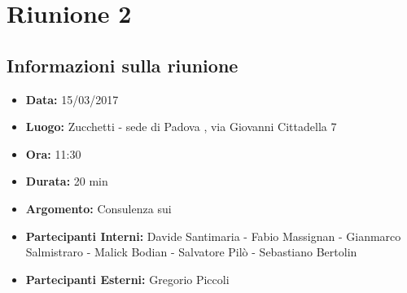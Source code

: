	\section{Riunione 2}
	  \subsection{Informazioni sulla riunione}
	    \begin{itemize}
	      \item \textbf{Data: } 15/03/2017
	      \item \textbf{Luogo: } Zucchetti - sede di Padova , via Giovanni Cittadella 7
	      \item \textbf{Ora: } 11:30
	      \item \textbf{Durata: } 20 min
	      \item \textbf{Argomento: } Consulenza sui 
	      \item \textbf{Partecipanti Interni: } Davide Santimaria - Fabio Massignan - Gianmarco Salmistraro - Malick Bodian - Salvatore Pilò - Sebastiano Bertolin
	      \item \textbf{Partecipanti Esterni: } Gregorio Piccoli
	    \end{itemize}


